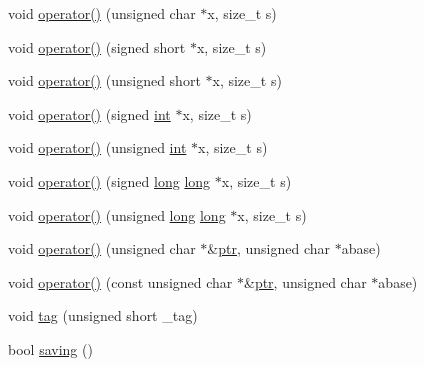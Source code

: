 \begin{DoxyCompactItemize}
void \hyperlink{classgambatte_1_1loadsave__load_aabf9a95ede92c9905c3ff6ba6cf49e0e}{operator()} (unsigned char $\ast$x, size\+\_\+t s)
\item 
void \hyperlink{classgambatte_1_1loadsave__load_a7123df06b1844de40a70de8acb6f4a20}{operator()} (signed short $\ast$x, size\+\_\+t s)
\item 
void \hyperlink{classgambatte_1_1loadsave__load_a0a45f5a10b88dac757b14fe0c0ebfce6}{operator()} (unsigned short $\ast$x, size\+\_\+t s)
\item 
void \hyperlink{classgambatte_1_1loadsave__load_a3ea605ff0d7fa8d09e57c02d444b8850}{operator()} (signed \hyperlink{ioapi_8h_a787fa3cf048117ba7123753c1e74fcd6}{int} $\ast$x, size\+\_\+t s)
\item 
void \hyperlink{classgambatte_1_1loadsave__load_a8a358ad29b9df4d704cebe61585df877}{operator()} (unsigned \hyperlink{ioapi_8h_a787fa3cf048117ba7123753c1e74fcd6}{int} $\ast$x, size\+\_\+t s)
\item 
void \hyperlink{classgambatte_1_1loadsave__load_a0d28f32c599ce42adf51dc1cfe607123}{operator()} (signed \hyperlink{ioapi_8h_a3c7b35ad9dab18b8310343c201f7b27e}{long} \hyperlink{ioapi_8h_a3c7b35ad9dab18b8310343c201f7b27e}{long} $\ast$x, size\+\_\+t s)
\item 
void \hyperlink{classgambatte_1_1loadsave__load_a3ac6797ca2311f63b2f4ec080de5f1d9}{operator()} (unsigned \hyperlink{ioapi_8h_a3c7b35ad9dab18b8310343c201f7b27e}{long} \hyperlink{ioapi_8h_a3c7b35ad9dab18b8310343c201f7b27e}{long} $\ast$x, size\+\_\+t s)
\item 
void \hyperlink{classgambatte_1_1loadsave__load_aa2d8402dc6fdececfd223520fc9cf0d8}{operator()} (unsigned char $\ast$\&\hyperlink{classgambatte_1_1loadsave__load_ab49af43a813936002e9adb21103beae8}{ptr}, unsigned char $\ast$abase)
\item 
void \hyperlink{classgambatte_1_1loadsave__load_a58313e7e62236560888348cf8e779cb0}{operator()} (const unsigned char $\ast$\&\hyperlink{classgambatte_1_1loadsave__load_ab49af43a813936002e9adb21103beae8}{ptr}, unsigned char $\ast$abase)
\item 
void \hyperlink{classgambatte_1_1loadsave__load_a85b86aaebae87da4bead8d3ed4ac3a9c}{tag} (unsigned short \+\_\+tag)
\item 
bool \hyperlink{classgambatte_1_1loadsave__load_a2ac8e306cef4eab6a804deab9e853fd3}{saving} ()
\end{DoxyCompactItemize}
